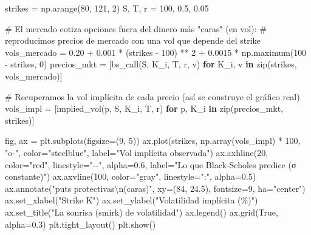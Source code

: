 \documentclass[
  spanish,
  letterpaper,
  DIV=11,
  numbers=noendperiod]{scrreprt}
\newenvironment{Shaded}{\begin{snugshade}}{\end{snugshade}}
\newcommand{\BuiltInTok}[1]{\textcolor[rgb]{0.00,0.23,0.31}{#1}}
\newcommand{\CharTok}[1]{\textcolor[rgb]{0.13,0.47,0.30}{#1}}
\newcommand{\CommentTok}[1]{\textcolor[rgb]{0.37,0.37,0.37}{#1}}
\newcommand{\ControlFlowTok}[1]{\textcolor[rgb]{0.00,0.23,0.31}{\textbf{#1}}}
\newcommand{\DecValTok}[1]{\textcolor[rgb]{0.68,0.00,0.00}{#1}}
\newcommand{\FloatTok}[1]{\textcolor[rgb]{0.68,0.00,0.00}{#1}}
\newcommand{\KeywordTok}[1]{\textcolor[rgb]{0.00,0.23,0.31}{\textbf{#1}}}
\newcommand{\NormalTok}[1]{\textcolor[rgb]{0.00,0.23,0.31}{#1}}
\newcommand{\OperatorTok}[1]{\textcolor[rgb]{0.37,0.37,0.37}{#1}}
\newcommand{\StringTok}[1]{\textcolor[rgb]{0.13,0.47,0.30}{#1}}
\newcommand{\VariableTok}[1]{\textcolor[rgb]{0.07,0.07,0.07}{#1}}
\begin{document}
\begin{Shaded}
\begin{Highlighting}[]
\NormalTok{strikes }\OperatorTok{=}\NormalTok{ np.arange(}\DecValTok{80}\NormalTok{, }\DecValTok{121}\NormalTok{, }\DecValTok{2}\NormalTok{)}
\NormalTok{S, T, r }\OperatorTok{=} \DecValTok{100}\NormalTok{, }\FloatTok{0.5}\NormalTok{, }\FloatTok{0.05}

\CommentTok{\# El mercado cotiza opciones fuera del dinero más "caras" (en vol):}
\CommentTok{\# reproducimos precios de mercado con una vol que depende del strike}
\NormalTok{vols\_mercado }\OperatorTok{=} \FloatTok{0.20} \OperatorTok{+} \FloatTok{0.001} \OperatorTok{*}\NormalTok{ (strikes }\OperatorTok{{-}} \DecValTok{100}\NormalTok{) }\OperatorTok{**} \DecValTok{2} \OperatorTok{+} \FloatTok{0.0015} \OperatorTok{*}\NormalTok{ np.maximum(}\DecValTok{100} \OperatorTok{{-}}\NormalTok{ strikes, }\DecValTok{0}\NormalTok{)}
\NormalTok{precios\_mkt }\OperatorTok{=}\NormalTok{ [bs\_call(S, K\_i, T, r, v) }\ControlFlowTok{for}\NormalTok{ K\_i, v }\KeywordTok{in} \BuiltInTok{zip}\NormalTok{(strikes, vols\_mercado)]}

\CommentTok{\# Recuperamos la vol implícita de cada precio (así se construye el gráfico real)}
\NormalTok{vols\_impl }\OperatorTok{=}\NormalTok{ [implied\_vol(p, S, K\_i, T, r) }\ControlFlowTok{for}\NormalTok{ p, K\_i }\KeywordTok{in} \BuiltInTok{zip}\NormalTok{(precios\_mkt, strikes)]}

\NormalTok{fig, ax }\OperatorTok{=}\NormalTok{ plt.subplots(figsize}\OperatorTok{=}\NormalTok{(}\DecValTok{9}\NormalTok{, }\DecValTok{5}\NormalTok{))}
\NormalTok{ax.plot(strikes, np.array(vols\_impl) }\OperatorTok{*} \DecValTok{100}\NormalTok{, }\StringTok{"o{-}"}\NormalTok{, color}\OperatorTok{=}\StringTok{"steelblue"}\NormalTok{,}
\NormalTok{        label}\OperatorTok{=}\StringTok{"Vol implícita observada"}\NormalTok{)}
\NormalTok{ax.axhline(}\DecValTok{20}\NormalTok{, color}\OperatorTok{=}\StringTok{"red"}\NormalTok{, linestyle}\OperatorTok{=}\StringTok{"{-}{-}"}\NormalTok{, alpha}\OperatorTok{=}\FloatTok{0.6}\NormalTok{,}
\NormalTok{           label}\OperatorTok{=}\StringTok{"Lo que Black{-}Scholes predice (σ constante)"}\NormalTok{)}
\NormalTok{ax.axvline(}\DecValTok{100}\NormalTok{, color}\OperatorTok{=}\StringTok{"gray"}\NormalTok{, linestyle}\OperatorTok{=}\StringTok{":"}\NormalTok{, alpha}\OperatorTok{=}\FloatTok{0.5}\NormalTok{)}
\NormalTok{ax.annotate(}\StringTok{"puts protectivas}\CharTok{\textbackslash{}n}\StringTok{(caras)"}\NormalTok{, xy}\OperatorTok{=}\NormalTok{(}\DecValTok{84}\NormalTok{, }\FloatTok{24.5}\NormalTok{), fontsize}\OperatorTok{=}\DecValTok{9}\NormalTok{, ha}\OperatorTok{=}\StringTok{"center"}\NormalTok{)}
\NormalTok{ax.set\_xlabel(}\StringTok{"Strike K"}\NormalTok{)}
\NormalTok{ax.set\_ylabel(}\StringTok{"Volatilidad implícita (\%)"}\NormalTok{)}
\NormalTok{ax.set\_title(}\StringTok{"La sonrisa (smirk) de volatilidad"}\NormalTok{)}
\NormalTok{ax.legend()}
\NormalTok{ax.grid(}\VariableTok{True}\NormalTok{, alpha}\OperatorTok{=}\FloatTok{0.3}\NormalTok{)}
\NormalTok{plt.tight\_layout()}
\NormalTok{plt.show()}
\end{Highlighting}
\end{Shaded}
\end{document}
